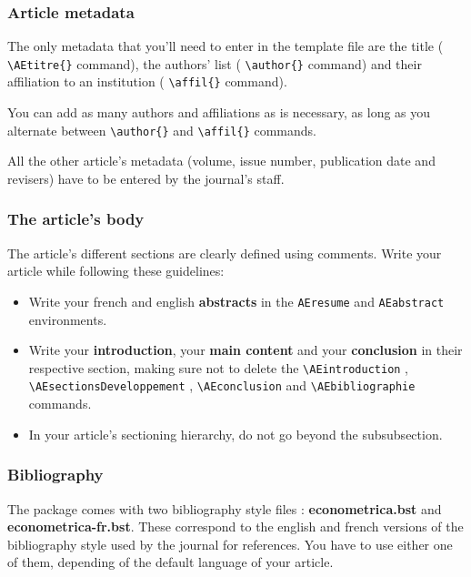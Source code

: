 \documentclass[english]{article}
\newcommand{\cmd}[1]{%
	\texttt{\textbackslash#1\{\}}
}
\newcommand{\dec}[1]{%
	\texttt{\textbackslash#1}
}
\begin{document}
			\subsubsection{Article metadata}
			
				The only metadata that you'll need to enter in the template file are the title
				(\cmd{AEtitre} command), the authors' list (\cmd{author} command)
				and their affiliation to an institution (\cmd{affil} command).
				
				You can add as many authors and affiliations as is necessary, as long as you alternate
				between \cmd{author} and \cmd{affil} commands.
				
				All the other article's metadata (volume, issue number, publication date and revisers) have
				to be entered by the journal's staff.
				
			\subsubsection{The article's body}
			
				The article's different sections are clearly defined using comments. Write your article
				while following these guidelines:
				
				\begin{itemize}
					\item Write your french and english \textbf{abstracts} in the \texttt{AEresume} and
						\texttt{AEabstract} environments.
					\item Write your \textbf{introduction}, your \textbf{main content} and your \textbf{conclusion} 
						in their respective section, making sure not to delete the \dec{AEintroduction},
						\dec{AEsectionsDeveloppement}, \dec{AEconclusion} and \dec{AEbibliographie} commands.
					\item In your article's sectioning hierarchy, do not go beyond the subsubsection.
				\end{itemize}
			
			\subsubsection{Bibliography}
			
				The package comes with two bibliography style files : \textbf{econometrica.bst} and 
				\textbf{econometrica-fr.bst}. These correspond to the english and french versions
				of the bibliography style used by the journal for references. You have to use either one
				of them, depending of the default language of your article.
	
\end{document}
